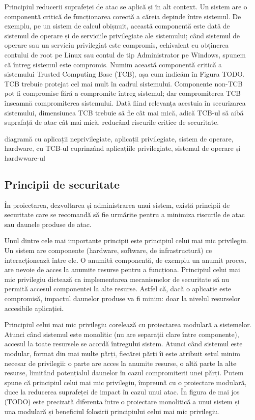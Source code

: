 Principiul reducerii suprafeței de atac se aplică și în alt context. Un sistem are o componentă critică de funcționarea corectă a căreia depinde între sistemul. De exemplu, pe un sistem de calcul obișnuit, această componentă este dată de sistemul de operare și de serviciile privilegiate ale sistemului; când sistemul de operare sau un serviciu privilegiat este compromis, echivalent cu obținerea contului de root pe Linux sau contul de tip Administrator pe Windows, spunem că întreg sistemul este compromis. Numim această componentă critică a sistemului Trusted Computing Base (TCB), așa cum indicăm în Figura TODO. TCB trebuie protejat cel mai mult în cadrul sistemului. Componente non-TCB pot fi compromise fără a compromite întreg sistemul; dar compromiterea TCB înseamnă compromiterea sistemului. Dată fiind relevanța acestuia în securizarea sistemului, dimensiunea TCB trebuie să fie cât mai mică, adică TCB-ul să aibă suprafață de atac cât mai mică, reducând riscurile critice de securitate.

diagramă cu aplicații neprivilegiate, aplicații privilegiate, sistem de operare, hardware, cu TCB-ul cuprinzând aplicațiile privilegiate, sistemul de operare și hardwware-ul

\subsection{Principii de securitate}
\label{sec:sec:principles}

În proiectarea, dezvoltarea și administrarea unui sistem, există principii de securitate care se recomandă să fie urmărite pentru a minimiza riscurile de atac sau daunele produse de atac.

Unul dintre cele mai importante principii este principiul celui mai mic privilegiu. Un sistem are componente (hardware, software, de infrastructură) ce interacționează între ele. O anumită componentă, de exemplu un anumit proces, are nevoie de acces la anumite resurse pentru a funcționa. Principiul celui mai mic privilegiu dictează ca implementarea mecanismelor de securitate să nu permită accesul componentei la alte resurse. Astfel că, dacă o aplicație este compromisă, impactul daunelor produse va fi minim: doar la nivelul resurselor accesibile aplicației.

Principiul celui mai mic privilegiu corelează cu proiectarea modulară a sistemelor. Atunci când sistemul este monolitic (nu are separații clare între componente), accesul la toate resursele se acordă întregului sistem. Atunci când sistemul este modular, format din mai multe părți, fiecărei părți îi este atribuit setul minim necesar de privilegii: o parte are acces la anumite resurse, o altă parte la alte resurse, limitând potențialul daunelor în cazul compromiterii unei părți. Putem spune că principiul celui mai mic privilegiu, împreună cu o proiectare modulară, duce la reducerea suprafeței de impact în cazul unui atac. În figura de mai jos (TODO) este precizată diferența între o proiectare monolitică a unui sistem și una modulară și beneficiul folosirii principiului celui mai mic privilegiu.

